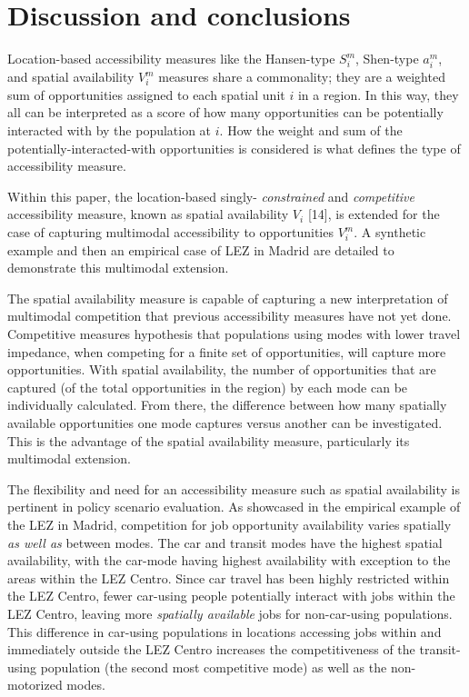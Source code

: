 \documentclass[10pt,letterpaper]{article}
\begin{document}
\hypertarget{discussion-and-conclusions}{%
\section{Discussion and conclusions}\label{discussion-and-conclusions}}

Location-based accessibility measures like the Hansen-type \(S_i^m\),
Shen-type \(a_i^m\), and spatial availability \(V_i^m\) measures share a
commonality; they are a weighted sum of opportunities assigned to each
spatial unit \(i\) in a region. In this way, they all can be interpreted
as a score of how many opportunities can be potentially interacted with
by the population at \(i\). How the weight and sum of the
potentially-interacted-with opportunities is considered is what defines
the type of accessibility measure.

Within this paper, the location-based singly- \emph{constrained} and
\emph{competitive} accessibility measure, known as spatial availability
\(V_i\) {[}14{]}, is extended for the case of capturing multimodal
accessibility to opportunities \(V_i^m\). A synthetic example and then
an empirical case of LEZ in Madrid are detailed to demonstrate this
multimodal extension.

The spatial availability measure is capable of capturing a new
interpretation of multimodal competition that previous accessibility
measures have not yet done. Competitive measures hypothesis that
populations using modes with lower travel impedance, when competing for
a finite set of opportunities, will capture more opportunities. With
spatial availability, the number of opportunities that are captured (of
the total opportunities in the region) by each mode can be individually
calculated. From there, the difference between how many spatially
available opportunities one mode captures versus another can be
investigated. This is the advantage of the spatial availability measure,
particularly its multimodal extension.

The flexibility and need for an accessibility measure such as spatial
availability is pertinent in policy scenario evaluation. As showcased in
the empirical example of the LEZ in Madrid, competition for job
opportunity availability varies spatially \emph{as well as} between
modes. The car and transit modes have the highest spatial availability,
with the car-mode having highest availability with exception to the
areas within the LEZ Centro. Since car travel has been highly restricted
within the LEZ Centro, fewer car-using people potentially interact with
jobs within the LEZ Centro, leaving more \emph{spatially available} jobs
for non-car-using populations. This difference in car-using populations
in locations accessing jobs within and immediately outside the LEZ
Centro increases the competitiveness of the transit-using population
(the second most competitive mode) as well as the non-motorized modes.
\end{document}
